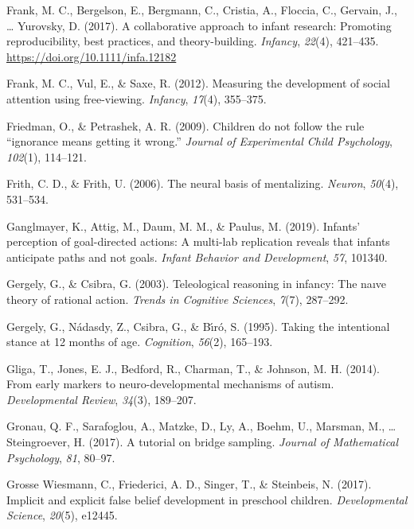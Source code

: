 \documentclass[
  man,floatsintext]{apa6}
\newlength{\cslhangindent}
\newenvironment{CSLReferences}[2] %
 {\begin{list}{}{%
  \setlength{\itemindent}{0pt}
  \setlength{\leftmargin}{0pt}
  \setlength{\parsep}{0pt}
  \ifodd #1
   \setlength{\leftmargin}{\cslhangindent}
   \setlength{\itemindent}{-1\cslhangindent}
  \fi
  \setlength{\itemsep}{#2\baselineskip}}}
 {\end{list}}
\begin{document}
\begin{CSLReferences}{1}{0}
Frank, M. C., Bergelson, E., Bergmann, C., Cristia, A., Floccia, C., Gervain, J., \ldots{} Yurovsky, D. (2017). A collaborative approach to infant research: Promoting reproducibility, best practices, and theory-building. \emph{Infancy}, \emph{22}(4), 421--435. \url{https://doi.org/10.1111/infa.12182}

Frank, M. C., Vul, E., \& Saxe, R. (2012). Measuring the development of social attention using free-viewing. \emph{Infancy}, \emph{17}(4), 355--375.

Friedman, O., \& Petrashek, A. R. (2009). Children do not follow the rule {``ignorance means getting it wrong.''} \emph{Journal of Experimental Child Psychology}, \emph{102}(1), 114--121.

Frith, C. D., \& Frith, U. (2006). The neural basis of mentalizing. \emph{Neuron}, \emph{50}(4), 531--534.

Ganglmayer, K., Attig, M., Daum, M. M., \& Paulus, M. (2019). Infants' perception of goal-directed actions: A multi-lab replication reveals that infants anticipate paths and not goals. \emph{Infant Behavior and Development}, \emph{57}, 101340.

Gergely, G., \& Csibra, G. (2003). Teleological reasoning in infancy: The na{ı}ve theory of rational action. \emph{Trends in Cognitive Sciences}, \emph{7}(7), 287--292.

Gergely, G., Nádasdy, Z., Csibra, G., \& Bı́ró, S. (1995). Taking the intentional stance at 12 months of age. \emph{Cognition}, \emph{56}(2), 165--193.

Gliga, T., Jones, E. J., Bedford, R., Charman, T., \& Johnson, M. H. (2014). From early markers to neuro-developmental mechanisms of autism. \emph{Developmental Review}, \emph{34}(3), 189--207.

Gronau, Q. F., Sarafoglou, A., Matzke, D., Ly, A., Boehm, U., Marsman, M., \ldots{} Steingroever, H. (2017). A tutorial on bridge sampling. \emph{Journal of Mathematical Psychology}, \emph{81}, 80--97.

Grosse Wiesmann, C., Friederici, A. D., Singer, T., \& Steinbeis, N. (2017). Implicit and explicit false belief development in preschool children. \emph{Developmental Science}, \emph{20}(5), e12445.


\end{CSLReferences}
\end{document}
